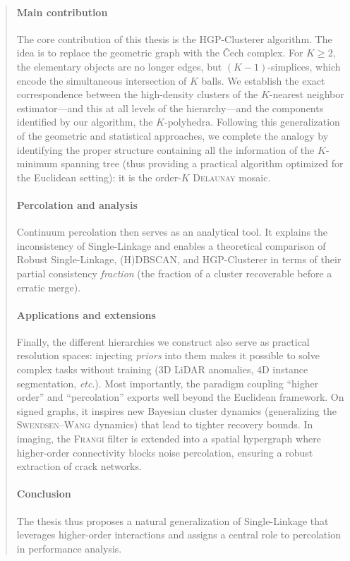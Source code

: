 \begin{AbstractPage}
\begin{abstract}
\paragraph{Main contribution}
The core contribution of this thesis is the HGP-Clusterer algorithm. The idea is to replace the geometric graph with the \v{C}ech complex. For \(K\geq2\), the elementary objects are no longer edges, but \((K-1)\)-simplices, which encode the simultaneous intersection of \(K\) balls. 
We establish the exact correspondence between the high-density clusters of the $K$-nearest neighbor estimator---and this at all levels of the hierarchy---and the components identified by our algorithm, the \(K\)-polyhedra. 
Following this generalization of the geometric and statistical approaches, we complete the analogy by identifying the proper structure containing all the information of the $K$-minimum spanning tree (thus providing a practical algorithm optimized for the Euclidean setting): it is the order-$K$ \textsc{Delaunay} mosaic.

\paragraph{Percolation and analysis}
Continuum percolation then serves as an analytical tool. It explains the inconsistency of Single-Linkage and enables a theoretical comparison of Robust Single-Linkage, (H)DBSCAN, and HGP-Clusterer in terms of their partial consistency \emph{fraction} (the fraction of a cluster recoverable before a erratic merge). 

\paragraph{Applications and extensions}
Finally, the different hierarchies we construct also serve as practical resolution spaces: injecting \emph{priors} into them makes it possible to solve complex tasks without training (3D LiDAR anomalies, 4D instance segmentation, \emph{etc}.). Most importantly, the paradigm coupling ``higher order'' and ``percolation'' exports well beyond the Euclidean framework. On signed graphs, it inspires new Bayesian cluster dynamics (generalizing the \textsc{Swendsen--Wang} dynamics) that lead to tighter recovery bounds. In imaging, the \textsc{Frangi} filter is extended into a spatial hypergraph where higher-order connectivity blocks noise percolation, ensuring a robust extraction of crack networks.

\paragraph{Conclusion}
The thesis thus proposes a natural generalization of Single-Linkage that leverages higher-order interactions and assigns a central role to percolation in performance analysis. %
\end{abstract}


\end{AbstractPage}
